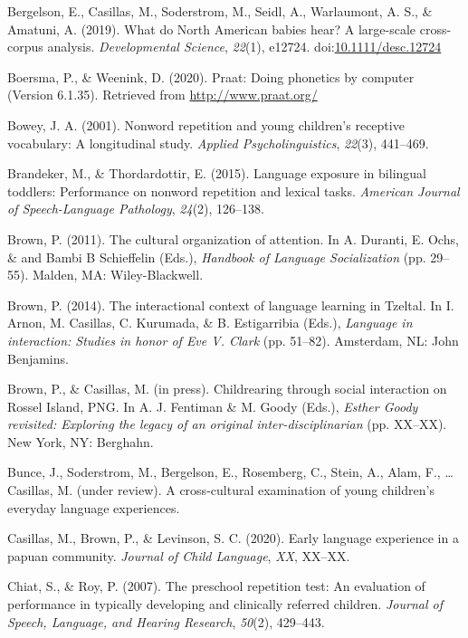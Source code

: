\documentclass[english,,man,floatsintext]{apa6}
\begin{document}
\hypertarget{ref-bergelsoncasillas2019what}{}
Bergelson, E., Casillas, M., Soderstrom, M., Seidl, A., Warlaumont, A.
S., \& Amatuni, A. (2019). What do North American babies hear? A
large-scale cross-corpus analysis. \emph{Developmental Science},
\emph{22}(1), e12724.
doi:\href{https://doi.org/10.1111/desc.12724}{10.1111/desc.12724}

\hypertarget{ref-Praat}{}
Boersma, P., \& Weenink, D. (2020). Praat: Doing phonetics by computer
(Version 6.1.35). Retrieved from \url{http://www.praat.org/}

\hypertarget{ref-bowey2001nonword}{}
Bowey, J. A. (2001). Nonword repetition and young children's receptive
vocabulary: A longitudinal study. \emph{Applied Psycholinguistics},
\emph{22}(3), 441--469.

\hypertarget{ref-brandeker2015language}{}
Brandeker, M., \& Thordardottir, E. (2015). Language exposure in
bilingual toddlers: Performance on nonword repetition and lexical tasks.
\emph{American Journal of Speech-Language Pathology}, \emph{24}(2),
126--138.

\hypertarget{ref-brown2011cultural}{}
Brown, P. (2011). The cultural organization of attention. In A. Duranti,
E. Ochs, \& and Bambi B Schieffelin (Eds.), \emph{Handbook of Language
Socialization} (pp. 29--55). Malden, MA: Wiley-Blackwell.

\hypertarget{ref-brown2014interactional}{}
Brown, P. (2014). The interactional context of language learning in
Tzeltal. In I. Arnon, M. Casillas, C. Kurumada, \& B. Estigarribia
(Eds.), \emph{Language in interaction: Studies in honor of Eve V. Clark}
(pp. 51--82). Amsterdam, NL: John Benjamins.

\hypertarget{ref-brownIPchildrearing}{}
Brown, P., \& Casillas, M. (in press). Childrearing through social
interaction on Rossel Island, PNG. In A. J. Fentiman \& M. Goody (Eds.),
\emph{Esther Goody revisited: Exploring the legacy of an original
inter-disciplinarian} (pp. XX--XX). New York, NY: Berghahn.

\hypertarget{ref-bunceURcrosscultural}{}
Bunce, J., Soderstrom, M., Bergelson, E., Rosemberg, C., Stein, A.,
Alam, F., \ldots{} Casillas, M. (under review). A cross-cultural
examination of young children's everyday language experiences.

\hypertarget{ref-casillas2020early}{}
Casillas, M., Brown, P., \& Levinson, S. C. (2020). Early language
experience in a papuan community. \emph{Journal of Child Language},
\emph{XX}, XX--XX.

\hypertarget{ref-chiat2007preschool}{}
Chiat, S., \& Roy, P. (2007). The preschool repetition test: An
evaluation of performance in typically developing and clinically
referred children. \emph{Journal of Speech, Language, and Hearing
Research}, \emph{50}(2), 429--443.
\end{document}
